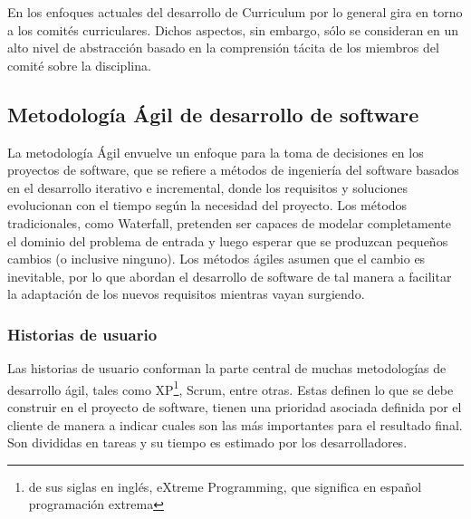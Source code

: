 En los enfoques actuales del desarrollo de Curriculum por lo general gira en torno a los comités curriculares. Dichos aspectos, sin embargo, sólo se consideran en un alto nivel de abstracción basado en la comprensión tácita de los miembros del comité sobre la disciplina.


\subsection{Metodología Ágil de desarrollo de software}
La metodología Ágil envuelve un enfoque para la toma de decisiones en los proyectos de software, que se refiere a métodos de ingeniería del software basados en el desarrollo iterativo e incremental, donde los requisitos y soluciones evolucionan con el tiempo según la necesidad del proyecto\citep{davis_agile_2015}. Los métodos tradicionales, como Waterfall, pretenden ser capaces de modelar completamente el dominio del problema de entrada y luego esperar que se produzcan pequeños cambios (o inclusive ninguno)\citep{davis_agile_2015}. Los métodos ágiles asumen que el cambio es inevitable, por lo que abordan el desarrollo de software de tal manera a facilitar la adaptación de los nuevos requisitos mientras vayan surgiendo.



\subsubsection{Historias de usuario}
Las historias de usuario conforman la parte central de muchas metodologías de desarrollo ágil, tales como XP\footnote{de sus siglas en inglés, eXtreme Programming, que significa en español programación extrema}, Scrum, entre otras. Estas definen lo que se debe construir en el proyecto de software, tienen una prioridad asociada definida por el cliente de manera a indicar cuales son las más importantes para el resultado final. Son divididas en tareas y su tiempo es estimado por los desarrolladores.

